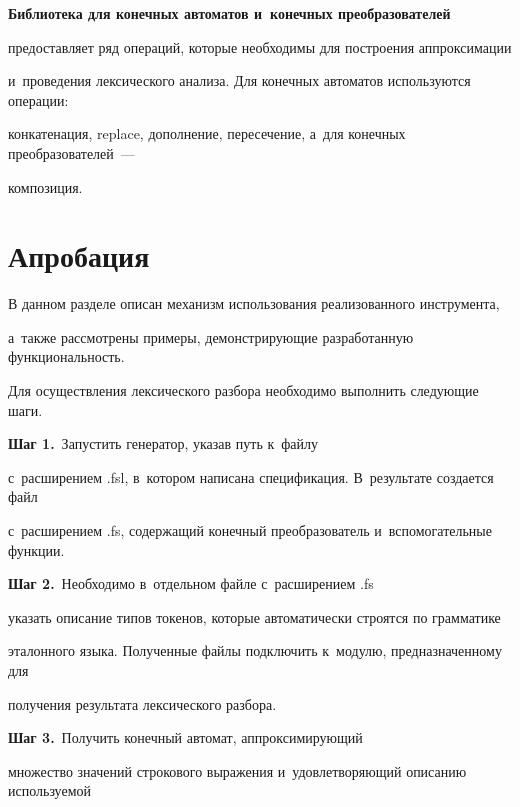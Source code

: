 \textbf{Библиотека для конечных автоматов и~конечных преобразователей} 


пред\-остав\-ляет ряд операций, которые необходимы для построения аппроксимации 


и~проведения лексического анализа. Для конечных автоматов используются операции: 


конкатенация, replace, дополнение, пересечение,  а~для конечных преобразователей~--- 


композиция.





\section{Апробация}





В данном разделе описан механизм использования реализованного инструмента, 


а~также рассмотрены примеры, демонстрирующие разработанную функциональность.





Для осуществления лексического разбора необходимо выполнить следующие шаги.





\textbf{{Шаг 1.}}\ Запустить генератор, указав путь к~файлу 


с~расширением .fsl, в~котором написана спецификация. В~результате создается файл 


с~расширением .fs, содержащий конечный преобразователь и~вспомогательные функции.





\textbf{{Шаг 2.}}\ Необходимо в~отдельном файле с~расширением .fs 


указать описание типов токенов, которые автоматически строятся по грамматике 


эталонного языка. Полученные файлы подключить к~модулю, предназначенному для 


получения результата лексического разбора.





\textbf{{Шаг 3.}}\ Получить конечный автомат, аппроксимирующий 


множество значений строкового выражения и~удовлетворяющий описанию используемой 


